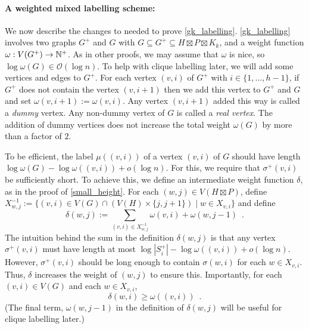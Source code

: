 \documentclass{patmorin}
\renewcommand{\ge}{\geqslant}
\newcommand{\defin}[1]{\emph{\textcolor{brightmaroon}{#1}}}
\newcommand{\Oh}{\mathcal{O}}
\begin{document}
  \paragraph{A weighted mixed labelling scheme:}
  We now describe the changes to \cite{gawrychowski.janczewski:simpler,dujmovic.esperet.ea:adjacency} needed to prove \cref{gk_labelling}.
  \cref{gk_labelling} involves two graphs $G^+$ and $G$ with $G\subseteq G^+\subseteq H\boxtimes P\boxtimes K_k$, and a weight function $\omega:V(G^+)\to\mathbb{N}^+$.  As in other proofs, we may assume that $\omega$ is nice, so $\log\omega(G)\in\Oh(\log n)$.  To help with clique labelling later, we will add some vertices and edges to $G^+$.  For each vertex $(v,i)$ of $G^+$ with $i\in\{1,\ldots,h-1\}$, if $G^+$ does not contain the vertex $(v,i+1)$ then we add this vertex to $G^+$ and $G$ and set $\omega(v,i+1):=\omega(v,i)$.  Any vertex $(v,i+1)$ added this way is called a \defin{dummy} vertex.  Any non-dummy vertex of $G$ is called a \defin{real vertex}.  The addition of dummy vertices does not increase the total weight $\omega(G)$ by more than a factor of $2$.



  To be efficient, the label $\mu((v,i))$ of a vertex $(v,i)$ of $G$ should have length $\log \omega(G)-\log\omega((v,i)) + o(\log n)$.  For this, we require that $\sigma^+(v,i)$ be sufficiently short.  To achieve this, we define an intermediate weight function $\delta$, as in the proof of \cref{small_height}.  For each $(w,j)\in V(H\boxtimes P)$, define $X^{-1}_{w,j}:=\{(v,i)\in V(G)\cap (V(H)\times\{j,j+1\})\mid w\in X_{v,i}\}$ and define
  \[
    \delta(w,j):=\sum_{(v,i)\in X^{-1}_{w,j}}\omega(v,i) + \omega(w,j-1) \enspace .
  \]
  The intuition behind the sum in the definition $\delta(w,j)$ is that any vertex $\sigma^+(v,i)$ must have length at most $\log|S^+_i|-\log\omega((v,i))+o(\log n)$.  However, $\sigma^+(v,i)$ should be long enough to contain $\sigma(w,i)$ for each $w\in X_{v,i}$.  Thus, $\delta$ increases the weight of $(w,j)$ to ensure this.
  Importantly, for each $(v,i)\in V(G)$ and each $w\in X_{v,i}$,
  \begin{equation}
    \delta(w,i) \ge \omega((v,i)) \enspace . \label{delta_v_omega}
  \end{equation}
  (The final term, $\omega(w,j-1)$ in the definition of $\delta(w,j)$ will be useful for clique labelling later.)
\end{document}
